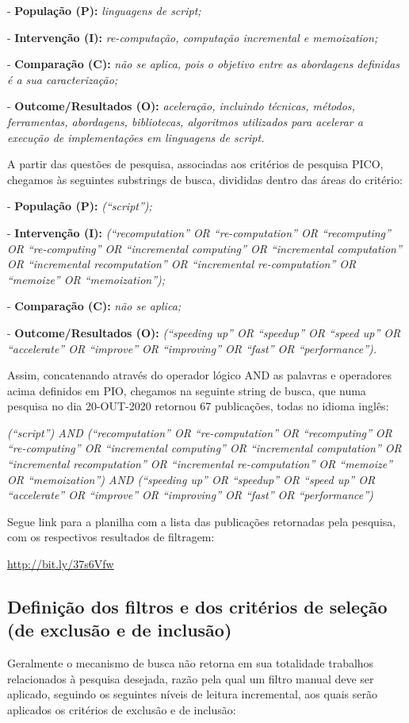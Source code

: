 \documentclass[sigconf]{acmart}
\begin{document}
- \textbf{População (P):} {\textit {linguagens de script;}}

- \textbf{Intervenção (I):} {\textit {re-computação, computação incremental e memoization;}}

- \textbf{Comparação (C):} {\textit {não se aplica, pois o objetivo entre as abordagens definidas é a sua caracterização;}}

- \textbf{Outcome/Resultados (O):} {\textit {aceleração, incluindo técnicas, métodos, ferramentas, abordagens, bibliotecas, algoritmos utilizados para acelerar a execução de implementações em linguagens de script.}}

A partir das questões de pesquisa, associadas aos critérios de pesquisa PICO, chegamos às seguintes substrings de busca, divididas dentro das áreas do critério: 

- \textbf{População (P):} {\textit {(“script”);}}

- \textbf{Intervenção (I):} {\textit {(“recomputation” OR “re-computation” OR “recomputing” OR “re-computing” OR “incremental computing” OR “incremental computation” OR “incremental recomputation” OR “incremental re-computation” OR “memoize” OR “memoization”);}}

- \textbf{Comparação (C):} {\textit {não se aplica;}}

- \textbf{Outcome/Resultados (O):} {\textit {(“speeding up” OR “speedup” OR “speed up” OR  “accelerate” OR “improve” OR “improving” OR “fast” OR “performance”).}}

Assim, concatenando através do operador lógico AND as palavras e operadores acima definidos em PIO, chegamos na seguinte string de busca, que numa pesquisa no dia 20-OUT-2020 retornou 67 publicações, todas no idioma inglês:

{\textit {(“script”) AND (“recomputation” OR “re-computation” OR “recomputing” OR “re-computing” OR “incremental computing” OR “incremental computation” OR “incremental recomputation” OR “incremental re-computation” OR “memoize” OR “memoization”) AND (“speeding up” OR “speedup” OR “speed up” OR “accelerate” OR “improve” OR “improving” OR “fast” OR “performance”)}}

Segue link para a planilha com a lista das publicações retornadas pela pesquisa, com os respectivos resultados de filtragem:

\url{http://bit.ly/37s6Vfw}


\subsection{Definição dos filtros e dos critérios de seleção (de exclusão e de inclusão)}
Geralmente o mecanismo de busca não retorna em sua totalidade trabalhos relacionados à pesquisa desejada, razão pela qual um filtro manual deve ser aplicado, seguindo os seguintes níveis de leitura incremental, aos quais serão aplicados os critérios de exclusão e de inclusão:
\end{document}
